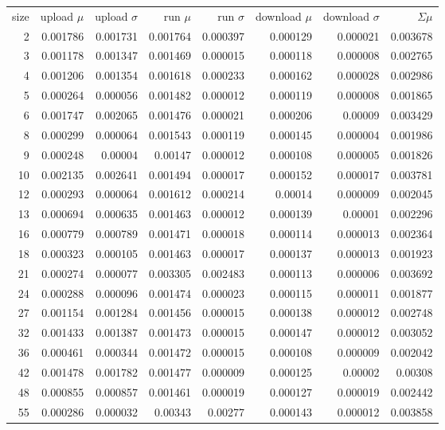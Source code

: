 \begin{longtable}{r r r r r r r r}
size & upload $\mu$  & upload $\sigma$ & run $\mu$ & run $\sigma$ & download $\mu$ & download $\sigma$ & $\Sigma \mu$ \\
2 & 0.001786 & 0.001731 & 0.001764 & 0.000397 & 0.000129 & 0.000021 & 0.003678 \\
3 & 0.001178 & 0.001347 & 0.001469 & 0.000015 & 0.000118 & 0.000008 & 0.002765 \\
4 & 0.001206 & 0.001354 & 0.001618 & 0.000233 & 0.000162 & 0.000028 & 0.002986 \\
5 & 0.000264 & 0.000056 & 0.001482 & 0.000012 & 0.000119 & 0.000008 & 0.001865 \\
6 & 0.001747 & 0.002065 & 0.001476 & 0.000021 & 0.000206 & 0.00009 & 0.003429 \\
8 & 0.000299 & 0.000064 & 0.001543 & 0.000119 & 0.000145 & 0.000004 & 0.001986 \\
9 & 0.000248 & 0.00004 & 0.00147 & 0.000012 & 0.000108 & 0.000005 & 0.001826 \\
10 & 0.002135 & 0.002641 & 0.001494 & 0.000017 & 0.000152 & 0.000017 & 0.003781 \\
12 & 0.000293 & 0.000064 & 0.001612 & 0.000214 & 0.00014 & 0.000009 & 0.002045 \\
13 & 0.000694 & 0.000635 & 0.001463 & 0.000012 & 0.000139 & 0.00001 & 0.002296 \\
16 & 0.000779 & 0.000789 & 0.001471 & 0.000018 & 0.000114 & 0.000013 & 0.002364 \\
18 & 0.000323 & 0.000105 & 0.001463 & 0.000017 & 0.000137 & 0.000013 & 0.001923 \\
21 & 0.000274 & 0.000077 & 0.003305 & 0.002483 & 0.000113 & 0.000006 & 0.003692 \\
24 & 0.000288 & 0.000096 & 0.001474 & 0.000023 & 0.000115 & 0.000011 & 0.001877 \\
27 & 0.001154 & 0.001284 & 0.001456 & 0.000015 & 0.000138 & 0.000012 & 0.002748 \\
32 & 0.001433 & 0.001387 & 0.001473 & 0.000015 & 0.000147 & 0.000012 & 0.003052 \\
36 & 0.000461 & 0.000344 & 0.001472 & 0.000015 & 0.000108 & 0.000009 & 0.002042 \\
42 & 0.001478 & 0.001782 & 0.001477 & 0.000009 & 0.000125 & 0.00002 & 0.00308 \\
48 & 0.000855 & 0.000857 & 0.001461 & 0.000019 & 0.000127 & 0.000019 & 0.002442 \\
55 & 0.000286 & 0.000032 & 0.00343 & 0.00277 & 0.000143 & 0.000012 & 0.003858 \\

\end{longtable}
